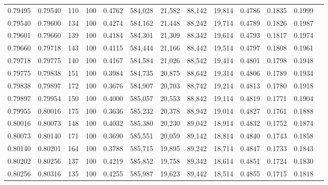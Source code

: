 \begin{tabular}{rrrrrrrrrrrrr}
0.79495 & 0.79540 &   110 & 100 &                                     0.4762 & 584,028 &  21,582 &  88,142 &  19,814 & 0.4786 & 0.1835 & 0.1999 \\
0.79540 & 0.79600 &   134 & 100 &                                     0.4274 & 584,162 &  21,448 &  88,242 &  19,714 & 0.4789 & 0.1826 & 0.1987 \\
0.79601 & 0.79660 &   139 & 100 &                                     0.4184 & 584,301 &  21,309 &  88,342 &  19,614 & 0.4793 & 0.1817 & 0.1974 \\
0.79660 & 0.79718 &   143 & 100 &                                     0.4115 & 584,444 &  21,166 &  88,442 &  19,514 & 0.4797 & 0.1808 & 0.1961 \\
0.79718 & 0.79775 &   140 & 100 &                                     0.4167 & 584,584 &  21,026 &  88,542 &  19,414 & 0.4801 & 0.1798 & 0.1948 \\
0.79775 & 0.79838 &   151 & 100 &                                     0.3984 & 584,735 &  20,875 &  88,642 &  19,314 & 0.4806 & 0.1789 & 0.1934 \\
0.79838 & 0.79897 &   172 & 100 &                                     0.3676 & 584,907 &  20,703 &  88,742 &  19,214 & 0.4813 & 0.1780 & 0.1918 \\
0.79897 & 0.79954 &   150 & 100 &                                     0.4000 & 585,057 &  20,553 &  88,842 &  19,114 & 0.4819 & 0.1771 & 0.1904 \\
0.79955 & 0.80016 &   175 & 100 &                                     0.3636 & 585,232 &  20,378 &  88,942 &  19,014 & 0.4827 & 0.1761 & 0.1888 \\
0.80016 & 0.80073 &   148 & 100 &                                     0.4032 & 585,380 &  20,230 &  89,042 &  18,914 & 0.4832 & 0.1752 & 0.1874 \\
0.80073 & 0.80140 &   171 & 100 &                                     0.3690 & 585,551 &  20,059 &  89,142 &  18,814 & 0.4840 & 0.1743 & 0.1858 \\
0.80140 & 0.80201 &   164 & 100 &                                     0.3788 & 585,715 &  19,895 &  89,242 &  18,714 & 0.4847 & 0.1733 & 0.1843 \\
0.80202 & 0.80256 &   137 & 100 &                                     0.4219 & 585,852 &  19,758 &  89,342 &  18,614 & 0.4851 & 0.1724 & 0.1830 \\
0.80256 & 0.80316 &   135 & 100 &                                     0.4255 & 585,987 &  19,623 &  89,442 &  18,514 & 0.4855 & 0.1715 & 0.1818 \\

\end{tabular}
